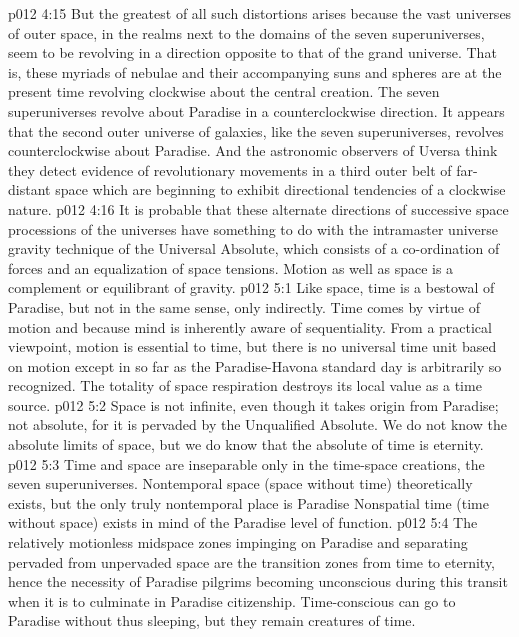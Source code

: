 \vs p012 4:15 But the greatest of all such distortions arises because the vast universes of outer space, in the realms next to the domains of the seven superuniverses, seem to be revolving in a direction opposite to that of the grand universe. That is, these myriads of nebulae and their accompanying suns and spheres are at the present time revolving clockwise about the central creation. The seven superuniverses revolve about Paradise in a counterclockwise direction. It appears that the second outer universe of galaxies, like the seven superuniverses, revolves counterclockwise about Paradise. And the astronomic observers of Uversa think they detect evidence of revolutionary movements in a third outer belt of far\hyp{}distant space which are beginning to exhibit directional tendencies of a clockwise nature.
\vs p012 4:16 It is probable that these alternate directions of successive space processions of the universes have something to do with the intramaster universe gravity technique of the Universal Absolute, which consists of a co\hyp{}ordination of forces and an equalization of space tensions. Motion as well as space is a complement or equilibrant of gravity.
\vs p012 5:1 Like space, time is a bestowal of Paradise, but not in the same sense, only indirectly. Time comes by virtue of motion and because mind is inherently aware of sequentiality. From a practical viewpoint, motion is essential to time, but there is no universal time unit based on motion except in so far as the Paradise\hyp{}Havona standard day is arbitrarily so recognized. The totality of space respiration destroys its local value as a time source.
\vs p012 5:2 Space is not infinite, even though it takes origin from Paradise; not absolute, for it is pervaded by the Unqualified Absolute. We do not know the absolute limits of space, but we do know that the absolute of time is eternity.
\pc \vs p012 5:3 Time and space are inseparable only in the time\hyp{}space creations, the seven superuniverses. Nontemporal space (space without time) theoretically exists, but the only truly nontemporal place is Paradise  Nonspatial time (time without space) exists in mind of the Paradise level of function.
\vs p012 5:4 The relatively motionless midspace zones impinging on Paradise and separating pervaded from unpervaded space are the transition zones from time to eternity, hence the necessity of Paradise pilgrims becoming unconscious during this transit when it is to culminate in Paradise citizenship. Time\hyp{}conscious  can go to Paradise without thus sleeping, but they remain creatures of time.
